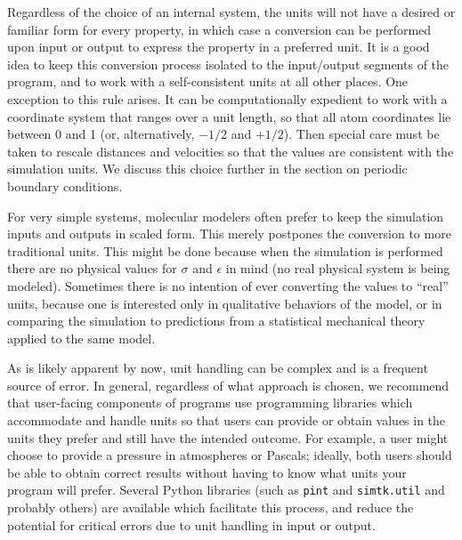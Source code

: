 \documentclass[]{article}
\begin{document}
Regardless of the choice of an internal system, the units will not have
a desired or familiar form for every property, in which case a
conversion can be performed upon input or output to express the property
in a preferred unit. It is a good idea to keep this conversion process
isolated to the input/output segments of the program, and to work with a
self-consistent units at all other places. One exception to this rule
arises. It can be computationally expedient to work with a coordinate
system that ranges over a unit length, so that all atom coordinates lie
between 0 and 1 (or, alternatively, $-1/2$ and $+1/2$). Then special care
must be taken to rescale distances and velocities so that the values are
consistent with the simulation units. We discuss this choice further in
the section on periodic boundary conditions.

For very simple systems, molecular modelers often prefer to keep the
simulation inputs and outputs in scaled form. This merely postpones the
conversion to more traditional units. This might be done because when
the simulation is performed there are no physical values for $\sigma$ and $\epsilon$ in
mind (no real physical system is being modeled). Sometimes there is no
intention of ever converting the values to ``real'' units, because one
is interested only in qualitative behaviors of the model, or in
comparing the simulation to predictions from a statistical mechanical
theory applied to the same model.

As is likely apparent by now, unit handling can be complex and is a frequent source of error.
In general, regardless of what approach is chosen, we recommend that user-facing components of programs use programming libraries which accommodate and handle units so that users can provide or obtain values in the units they prefer and still have the intended outcome. 
For example, a user might choose to provide a pressure in atmospheres or Pascals; ideally, both users should be able to obtain correct results without having to know what units your program will prefer.
Several Python libraries (such as \texttt{pint} and \texttt{simtk.util} and probably others) are available which facilitate this process, and reduce the potential for critical errors due to unit handling in input or output.
\end{document}
